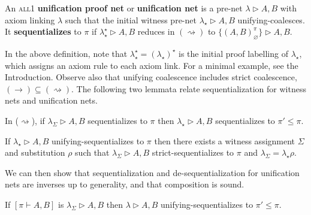 \documentclass[a4paper,UKenglish]{lipics-v2019}
\newcommand\defn[1]{\textbf{#1}}
\newcommand\all{\textsc{all}}
\newcommand\+{+}
\renewcommand\*{\times}
\newcommand\prf[3]{#1\vdash\!#2,#3}
\newcommand\net[3]{#1\triangleright #2,#3}
\newcommand\link[3][\sigma]{(#2,#3)_{#1}}
\newcommand\scoal{\rightarrow} %
\newcommand\ucoal{\rightsquigarrow}
\begin{document}
\begin{definition}
An \all{\textnormal 1} \defn{unification proof net} or \defn{unification net} is a pre-net $\net\lambda AB$ with axiom linking $\lambda$ such that the initial witness pre-net $\net{\lambda_\star}AB$ unifying-coalesces. It \defn{sequentializes} to $\pi$ if $\net{\lambda^\star_\star}AB$ reduces in $(\ucoal)$ to $\net{\{\link[\varnothing]AB^\pi\}}AB$.
\end{definition}

In the above definition, note that $\lambda_\star^\star=(\lambda_\star)^\star$ is the initial proof labelling of $\lambda_\star$, which assigns an axiom rule to each axiom link. For a minimal example, see the Introduction. Observe also that unifying coalescence includes strict coalescence, $(\scoal)\subseteq(\ucoal)$. The following two lemmata relate sequentialization for witness nets and unification nets.

\begin{lemma}
\label{lem:ucoal generality}
In ($\ucoal$), if $\net{\lambda_\Sigma}AB$ sequentializes to $\pi$ then $\net{\lambda_\star}AB$ sequentializes to $\pi'\leq\pi$.
\end{lemma}

\begin{lemma}
\label{lem:unifying implies strict coalescence}
If $\net{\lambda_\star}AB$ unifying-sequentializes to $\pi$ then there exists a witness assignment $\Sigma$ and substitution $\rho$ such that $\net{\lambda_\Sigma}AB$ strict-sequentializes to $\pi$ and $\lambda_\Sigma=\lambda_\star\rho$.
\end{lemma}

We can then show that sequentialization and de-sequentialization for unification nets are inverses up to generality, and that composition is sound.

\begin{theorem}
\label{thm:unet deseq-seq}
If $[\prf\pi AB]$ is $\net{\lambda_\Sigma}AB$ then $\net\lambda AB$ unifying-sequentializes to $\pi'\leq \pi$.
\end{theorem}
\end{document}

